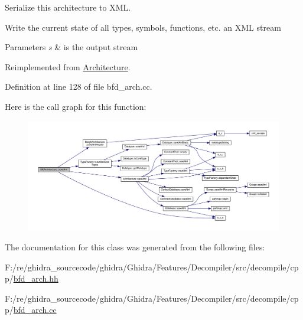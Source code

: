 Serialize this architecture to X\+ML. 

Write the current state of all types, symbols, functions, etc. an X\+ML stream 
\begin{DoxyParams}{Parameters}
{\em s} & is the output stream \\
\hline
\end{DoxyParams}


Reimplemented from \mbox{\hyperlink{class_architecture_af760a127622d4cdd4b6b436122478cb5}{Architecture}}.



Definition at line 128 of file bfd\+\_\+arch.\+cc.

Here is the call graph for this function\+:
\nopagebreak
\begin{figure}[H]
\begin{center}
\leavevmode
\includegraphics[width=350pt]{class_bfd_architecture_ac775d8894dd3abba1effafe22881a131_cgraph}
\end{center}
\end{figure}


The documentation for this class was generated from the following files\+:\begin{DoxyCompactItemize}
\item 
F\+:/re/ghidra\+\_\+sourcecode/ghidra/\+Ghidra/\+Features/\+Decompiler/src/decompile/cpp/\mbox{\hyperlink{bfd__arch_8hh}{bfd\+\_\+arch.\+hh}}\item 
F\+:/re/ghidra\+\_\+sourcecode/ghidra/\+Ghidra/\+Features/\+Decompiler/src/decompile/cpp/\mbox{\hyperlink{bfd__arch_8cc}{bfd\+\_\+arch.\+cc}}\end{DoxyCompactItemize}
